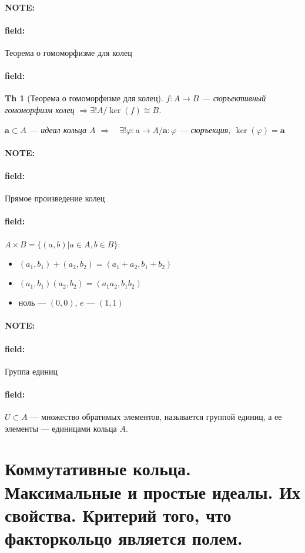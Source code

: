 \documentclass[12pt]{article}
\newenvironment{note}{\paragraph{NOTE:}}{}
\newenvironment{field}{\paragraph{field:}}{}
\newtheorem{theorem}{Th}
\begin{document}
\begin{note}
  \begin{field}
    Теорема о гомоморфизме для колец
  \end{field}
  \begin{field}
    \begin{theorem}[Теорема о гомоморфизме для колец]
      $f : A \rightarrow B$ --- сюръективный гомоморфизм колец
      $\Rightarrow \exists! A/\ker(f) \cong B$.

      $\mathbf{a} \subset A$ --- идеал кольца $A$
      $\Rightarrow \quad{} \exists! \varphi : a \rightarrow A/\mathbf{a} : \varphi$ --- сюръекция, $\ker(\varphi) = \mathbf{a}$
    \end{theorem}
  \end{field}
\end{note}

\begin{note}
  \begin{field}
    Прямое произведение колец
  \end{field}
  \begin{field}
    $A \times B = \{(a, b) | a \in A, b \in B\}$:
    \begin{itemize}
      \item
      $(a_{1}, b_{1}) + (a_{2}, b_{2}) = (a_{1} + a_{2}, b_{1} + b_{2})$
      \item
      $(a_{1}, b_{1})(a_{2}, b_{2}) = (a_{1}a_{2}, b_{1}b_{2})$
      \item
      ноль --- $(0, 0)$, $e$ --- $(1, 1)$
    \end{itemize}
  \end{field}
\end{note}

\begin{note}
  \begin{field}
    Группа единиц
  \end{field}
  \begin{field}
    $U \subset A$ --- множество обратимых элементов, называется группой единиц,
    а ее элементы --- единицами кольца $A$.
  \end{field}
\end{note}

\section{Коммутативные кольца. Максимальные и простые идеалы. Их свойства.
Критерий того, что факторкольцо является полем.}
\end{document}
